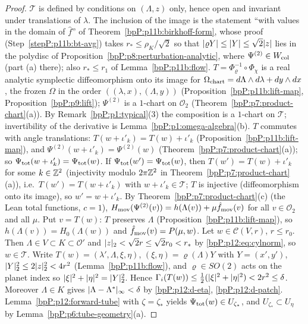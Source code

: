 \begin{proof}
\label{stepP:p12:ch-dom} $\mathcal T$ is defined by conditions on $(\Lambda,z)$ only, hence open and invariant under translations of $\lambda$. The inclusion of the image is the statement ``with values in the domain of $\hat f$'' of Theorem~\ref{bpP:p11b:birkhoff-form}, whose proof (Step~\ref{stepP:p11b:bt-avg}) takes $r_*\le\rho_K/\sqrt2$ so that $\lvert \varrho Y\rvert\le\lvert Y\rvert\le\sqrt2\lvert z\rvert$ lies in the polydisc of Proposition~\ref{bpP:p8:perturbation-analytic}, where $\Psi^{(2)}\in W_{\rm col}$ (part (a) there); also $r_*\le r_1$ of Lemma~\ref{bpP:p11b:flow}.
\label{stepP:p12:ch-chart} $T=\Phi_\varrho^{-1}\circ\Phi_\chi$ is a real analytic symplectic diffeomorphism onto its image for $\Omega_{\rm chart}=d\Lambda\wedge d\lambda+dy\wedge dx$, the frozen $\Omega$ in the order $((\lambda,x),(\Lambda,y))$ (Proposition~\ref{bpP:p11b:lift-map}, Proposition~\ref{bpP:p9:lift}); $\Psi^{(2)}$ is a $1$-chart on $\mathcal O_2$ (Theorem~\ref{bpP:p7:product-chart}(a)). By Remark~\ref{bpP:p1:typical}(3) the composition is a $1$-chart on $\mathcal T$; invertibility of the derivative is Lemma~\ref{bpP:p1:omega-algebra}(b).
\label{stepP:p12:ch-lat} $T$ commutes with angle translations: $T(w+\iota'_k)=T(w)+\iota'_k$ (Proposition~\ref{bpP:p11b:lift-map}), and $\Psi^{(2)}(w+\iota'_k)=\Psi^{(2)}(w)$ (Theorem~\ref{bpP:p7:product-chart}(a)); so $\Psi_{\rm tot}(w+\iota'_k)=\Psi_{\rm tot}(w)$. If $\Psi_{\rm tot}(w')=\Psi_{\rm tot}(w)$, then $T(w')=T(w)+\iota'_k$ for some $k\in\mathbb{Z}^2$ (injectivity modulo $2\pi\mathbb{Z}^2$ in Theorem~\ref{bpP:p7:product-chart}(a)), i.e.\ $T(w')=T(w+\iota'_k)$ with $w+\iota'_k\in\mathcal T$; $T$ is injective (diffeomorphism onto its image), so $w'=w+\iota'_k$.
\label{stepP:p12:ch-ham} By Theorem~\ref{bpP:p7:product-chart}(c) (the Lean total functions, $c=1$), $H_{\rm mov}(\Psi^{(2)}(v))=h(\Lambda(v))+\mu\hat f_{\rm mov}(v)$ for all $v\in\mathcal O_2$ and all $\mu$. Put $v=T(w)$: $T$ preserves $\Lambda$ (Proposition~\ref{bpP:p11b:lift-map}), so $h(\Lambda(v))=H_0(\Lambda(w))$ and $\hat f_{\rm mov}(v)=P(\mu,w)$.
\label{stepP:p12:ch-tube} Let $w\in\mathcal C(V,r)$, $r\le r_0$. Then $\Lambda\in V\subset K\subset\mathcal O'$ and $\lvert z\rvert_2<\sqrt2r\le\sqrt2r_0<r_*$ by \eqref{bpP:p12:eq:cylnorm}, so $w\in\mathcal T$. Write $T(w)=(\lambda',\Lambda,\xi,\eta)$, $(\xi,\eta)=\varrho(\Lambda)Y$ with $Y=(x',y')$, $\lvert Y\rvert_2^2\le2\lvert z\rvert_2^2<4r^2$ (Lemma~\ref{bpP:p11b:flow}), and $\varrho\in SO(2)$ acts on the planet index so $\lvert \xi\rvert^2+\lvert \eta\rvert^2=\lvert Y\rvert_2^2$. Hence $\Gamma_i(T(w))\le\tfrac12(\lvert \xi\rvert^2+\lvert \eta\rvert^2)<2r^2\le\delta$. Moreover $\Lambda\in K$ gives $\lvert \Lambda-\Lambda^*\rvert_\infty<\delta$ by \ref{bpP:p12:d-eta}, \ref{bpP:p12:d-patch}. Lemma~\ref{bpP:p12:forward-tube} with $\zeta=\zeta_*$ yields $\Psi_{\rm tot}(w)\in U_{\zeta_*}$, and $U_{\zeta_*}\subset U_\eta$ by Lemma~\ref{bpP:p6:tube-geometry}(a).
\end{proof}

